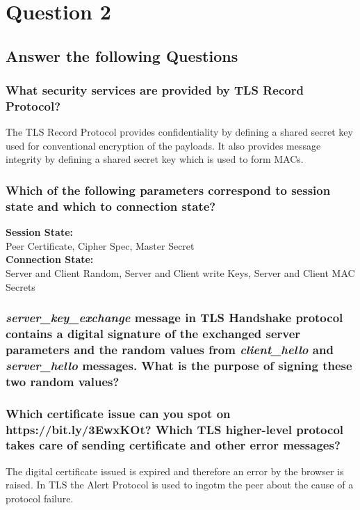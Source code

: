 \documentclass{report}
\begin{document}
	\section{Question 2}
	\startsection
		\renewcommand{\thesubsection}{\thesection.\Alph{subsection}}
		\subsection{Answer the following Questions}
		\startsubsection
			\subsubsection{What security services are provided by TLS Record Protocol?}
			\startsubsection
				The TLS Record Protocol provides confidentiality by defining a shared secret key used for conventional encryption of the payloads. It also provides message integrity by defining a shared secret key which is used to form MACs.
			\closesection
			\subsubsection{Which of the following parameters correspond to session state and which to connection state?}
			\startsubsection
				\textbf{Session State:} \\
				Peer Certificate, Cipher Spec, Master Secret \\
				\textbf{Connection State:} \\
				Server and Client Random, Server and Client write Keys, Server and Client MAC Secrets
			\closesection
			\subsubsection{\textit{server\_key\_exchange} message in TLS Handshake protocol contains a digital signature of the exchanged server parameters and the random values from \textit{client\_hello} and \textit{server\_hello} messages. What is the purpose of signing these two random values?}
			\startsubsection
			\closesection
			\subsubsection{Which certificate issue can you spot on https://bit.ly/3EwxKOt? Which TLS higher-level protocol takes care of sending certificate and other error messages?}
			\startsubsection
				The digital certificate issued is expired and therefore an error by the browser is raised. In TLS the Alert Protocol is used to ingotm the peer about the cause of a protocol failure.
			\closesection
		\closesection
		
\end{document}
